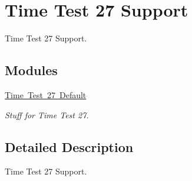 \hypertarget{group__RTEMSTimeTest27Support}{}\section{Time Test 27 Support}
\label{group__RTEMSTimeTest27Support}


Time Test 27 Support.  


\subsection*{Modules}
\begin{DoxyCompactItemize}
\item 
\mbox{\hyperlink{group__shared__tm27}{Time Test 27 Default}}
\begin{DoxyCompactList}\small\item\em Stuff for Time Test 27. \end{DoxyCompactList}\end{DoxyCompactItemize}


\subsection{Detailed Description}
Time Test 27 Support. 

